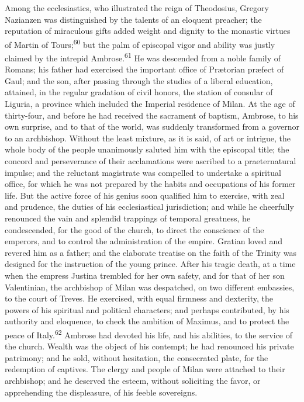 Among the ecclesiastics, who illustrated the reign of Theodosius,
Gregory Nazianzen was distinguished by the talents of an eloquent
preacher; the reputation of miraculous gifts added weight and
dignity to the monastic virtues of Martin of Tours;\textsuperscript{60} but the
palm of episcopal vigor and ability was justly claimed by the
intrepid Ambrose.\textsuperscript{61} He was descended from a noble family of
Romans; his father had exercised the important office of
Prætorian præfect of Gaul; and the son, after passing through
the studies of a liberal education, attained, in the regular
gradation of civil honors, the station of consular of Liguria, a
province which included the Imperial residence of Milan. At the
age of thirty-four, and before he had received the sacrament of
baptism, Ambrose, to his own surprise, and to that of the world,
was suddenly transformed from a governor to an archbishop.
Without the least mixture, as it is said, of art or intrigue, the
whole body of the people unanimously saluted him with the
episcopal title; the concord and perseverance of their
acclamations were ascribed to a praeternatural impulse; and the
reluctant magistrate was compelled to undertake a spiritual
office, for which he was not prepared by the habits and
occupations of his former life. But the active force of his
genius soon qualified him to exercise, with zeal and prudence,
the duties of his ecclesiastical jurisdiction; and while he
cheerfully renounced the vain and splendid trappings of temporal
greatness, he condescended, for the good of the church, to direct
the conscience of the emperors, and to control the administration
of the empire. Gratian loved and revered him as a father; and the
elaborate treatise on the faith of the Trinity was designed for
the instruction of the young prince. After his tragic death, at a
time when the empress Justina trembled for her own safety, and
for that of her son Valentinian, the archbishop of Milan was
despatched, on two different embassies, to the court of Treves.
He exercised, with equal firmness and dexterity, the powers of
his spiritual and political characters; and perhaps contributed,
by his authority and eloquence, to check the ambition of Maximus,
and to protect the peace of Italy.\textsuperscript{62} Ambrose had devoted his
life, and his abilities, to the service of the church. Wealth was
the object of his contempt; he had renounced his private
patrimony; and he sold, without hesitation, the consecrated
plate, for the redemption of captives. The clergy and people of
Milan were attached to their archbishop; and he deserved the
esteem, without soliciting the favor, or apprehending the
displeasure, of his feeble sovereigns.

